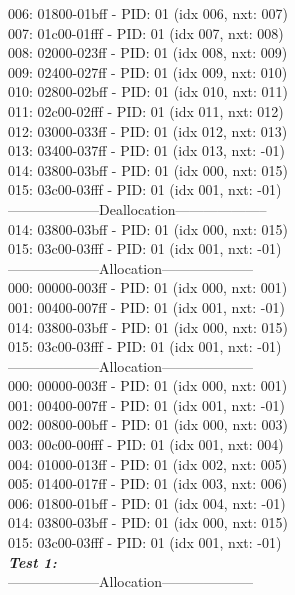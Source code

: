 \documentclass[10pt]{article}
\begin{document}
006: 01800-01bff - PID: 01 (idx 006, nxt: 007)\\
007: 01c00-01fff - PID: 01 (idx 007, nxt: 008)\\
008: 02000-023ff - PID: 01 (idx 008, nxt: 009)\\
009: 02400-027ff - PID: 01 (idx 009, nxt: 010)\\
010: 02800-02bff - PID: 01 (idx 010, nxt: 011)\\
011: 02c00-02fff - PID: 01 (idx 011, nxt: 012)\\
012: 03000-033ff - PID: 01 (idx 012, nxt: 013)\\
013: 03400-037ff - PID: 01 (idx 013, nxt: -01)\\
014: 03800-03bff - PID: 01 (idx 000, nxt: 015)\\
015: 03c00-03fff - PID: 01 (idx 001, nxt: -01)\\
--------------------Deallocation-------------------- \\
014: 03800-03bff - PID: 01 (idx 000, nxt: 015)\\
015: 03c00-03fff - PID: 01 (idx 001, nxt: -01)\\
--------------------Allocation-------------------- \\
000: 00000-003ff - PID: 01 (idx 000, nxt: 001)\\
001: 00400-007ff - PID: 01 (idx 001, nxt: -01)\\
014: 03800-03bff - PID: 01 (idx 000, nxt: 015)\\
015: 03c00-03fff - PID: 01 (idx 001, nxt: -01)\\
--------------------Allocation-------------------- \\
000: 00000-003ff - PID: 01 (idx 000, nxt: 001)\\
001: 00400-007ff - PID: 01 (idx 001, nxt: -01)\\
002: 00800-00bff - PID: 01 (idx 000, nxt: 003)\\
003: 00c00-00fff - PID: 01 (idx 001, nxt: 004)\\
004: 01000-013ff - PID: 01 (idx 002, nxt: 005)\\
005: 01400-017ff - PID: 01 (idx 003, nxt: 006)\\
006: 01800-01bff - PID: 01 (idx 004, nxt: -01)\\
014: 03800-03bff - PID: 01 (idx 000, nxt: 015)\\
015: 03c00-03fff - PID: 01 (idx 001, nxt: -01)\\
\textbf{\textit{Test 1:}}\\
--------------------Allocation-------------------- \\
\end{document}
